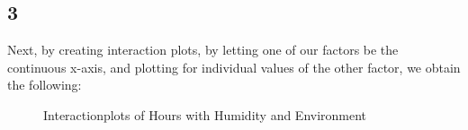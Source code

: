 \documentclass{article}
\begin{document}
    \subsection*{3}
    Next, by creating interaction plots, by letting one of our factors be the continuous x-axis, and plotting for individual values of the other factor, we obtain the following:
      \begin{figure}[H]
          \centering
          \caption{Interactionplots of Hours with Humidity and Environment}
          \label{fig:IntPlotHours}
      \end{figure}
\end{document}
